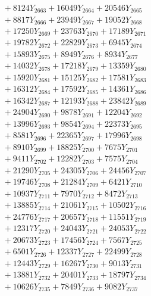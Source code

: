 \documentclass[a4paper,10pt]{article}
\begin{document}
{\begin{align}
&\;  + 8124 Y_{2663} + 16049 Y_{2664} + 20546 Y_{2665} \\[0.3ex]
&\;  + 8817 Y_{2666} + 23949 Y_{2667} + 19052 Y_{2668} \\[0.5ex]\allowbreak
&\;  + 17250 Y_{2669} + 23763 Y_{2670} + 17189 Y_{2671} \\[0.3ex]
&\;  + 19782 Y_{2672} + 22829 Y_{2673} + 6945 Y_{2674} \\[0.3ex]
&\;  + 15893 Y_{2675} + 8949 Y_{2676} + 8934 Y_{2677} \\[0.3ex]
&\;  + 14032 Y_{2678} + 17218 Y_{2679} + 13359 Y_{2680} \\[0.3ex]
&\;  + 15920 Y_{2681} + 15125 Y_{2682} + 17581 Y_{2683} \\[0.3ex]
&\;  + 16312 Y_{2684} + 17592 Y_{2685} + 14361 Y_{2686} \\[0.3ex]
&\;  + 16342 Y_{2687} + 12193 Y_{2688} + 23842 Y_{2689} \\[0.3ex]
&\;  + 24904 Y_{2690} + 9878 Y_{2691} + 12204 Y_{2692} \\[0.3ex]
&\;  + 13996 Y_{2693} + 9854 Y_{2694} + 22373 Y_{2695} \\[0.3ex]
&\;  + 8581 Y_{2696} + 22365 Y_{2697} + 17996 Y_{2698} \\[0.5ex]\allowbreak
&\;  + 8910 Y_{2699} + 18825 Y_{2700} + 7675 Y_{2701} \\[0.3ex]
&\;  + 9411 Y_{2702} + 12282 Y_{2703} + 7575 Y_{2704} \\[0.3ex]
&\;  + 21290 Y_{2705} + 24305 Y_{2706} + 24456 Y_{2707} \\[0.3ex]
&\;  + 19746 Y_{2708} + 21284 Y_{2709} + 6421 Y_{2710} \\[0.3ex]
&\;  + 10937 Y_{2711} + 7970 Y_{2712} + 8472 Y_{2713} \\[0.3ex]
&\;  + 13885 Y_{2714} + 21061 Y_{2715} + 10502 Y_{2716} \\[0.3ex]
&\;  + 24776 Y_{2717} + 20657 Y_{2718} + 11551 Y_{2719} \\[0.3ex]
&\;  + 12317 Y_{2720} + 24043 Y_{2721} + 24053 Y_{2722} \\[0.3ex]
&\;  + 20673 Y_{2723} + 17456 Y_{2724} + 7567 Y_{2725} \\[0.3ex]
&\;  + 6501 Y_{2726} + 12337 Y_{2727} + 22499 Y_{2728} \\[0.5ex]\allowbreak
&\;  + 12443 Y_{2729} + 16267 Y_{2730} + 9013 Y_{2731} \\[0.3ex]
&\;  + 13881 Y_{2732} + 20401 Y_{2733} + 18797 Y_{2734} \\[0.3ex]
&\;  + 10626 Y_{2735} + 7849 Y_{2736} + 9082 Y_{2737} \\[0.3ex]

\end{align}}
\end{document}
